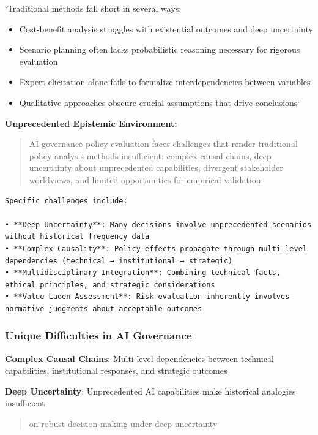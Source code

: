 \documentclass[
  11pt,
  letterpaper,
]{book}
\providecommand{\tightlist}{%
  \setlength{\itemsep}{0pt}\setlength{\parskip}{0pt}}
\begin{document}
`Traditional methods fall short in several ways:

\begin{itemize}
\tightlist
\item
  Cost-benefit analysis struggles with existential outcomes and deep
  uncertainty
\item
  Scenario planning often lacks probabilistic reasoning necessary for
  rigorous evaluation
\item
  Expert elicitation alone fails to formalize interdependencies between
  variables
\item
  Qualitative approaches obscure crucial assumptions that drive
  conclusions`
\end{itemize}

\textbf{Unprecedented Epistemic Environment:}

\begin{quote}
AI governance policy evaluation faces challenges that render traditional
policy analysis methods insufficient: complex causal chains, deep
uncertainty about unprecedented capabilities, divergent stakeholder
worldviews, and limited opportunities for empirical validation.
\end{quote}

\begin{verbatim}
Specific challenges include:

• **Deep Uncertainty**: Many decisions involve unprecedented scenarios without historical frequency data
• **Complex Causality**: Policy effects propagate through multi-level dependencies (technical → institutional → strategic)
• **Multidisciplinary Integration**: Combining technical facts, ethical principles, and strategic considerations
• **Value-Laden Assessment**: Risk evaluation inherently involves normative judgments about acceptable outcomes
\end{verbatim}

\subsubsection{Unique Difficulties in AI
Governance}\label{sec-unique-difficulties}

\textbf{Complex Causal Chains}: Multi-level dependencies between
technical capabilities, institutional responses, and strategic outcomes

\textbf{Deep Uncertainty}: Unprecedented AI capabilities make historical
analogies insufficient

\begin{quote}
\textcite{lempert2003} on robust decision-making under deep uncertainty
\end{quote}
\end{document}
